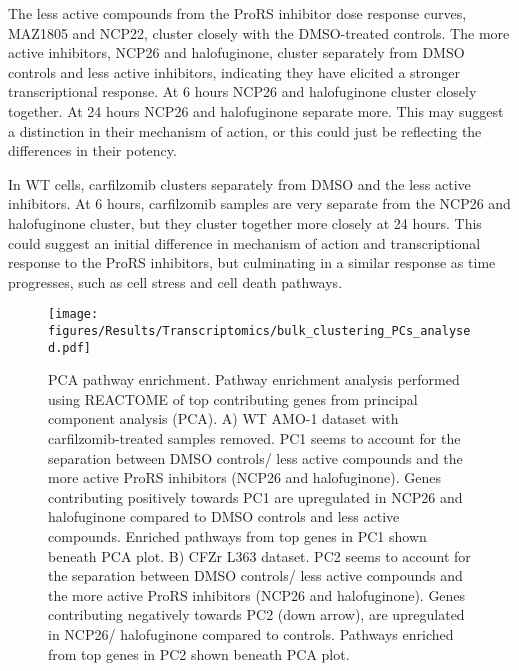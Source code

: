 The less active compounds from the ProRS inhibitor dose response curves, MAZ1805 and NCP22, cluster closely with the DMSO-treated controls.
The more active inhibitors, NCP26 and halofuginone, cluster separately from DMSO controls and less active inhibitors, indicating they have elicited a stronger transcriptional response.
At 6 hours NCP26 and halofuginone cluster closely together.
At 24 hours NCP26 and halofuginone separate more.
This may suggest a distinction in their mechanism of action, or this could just be reflecting the differences in their potency.

In WT cells, carfilzomib clusters separately from DMSO and the less active inhibitors.
At 6 hours, carfilzomib samples are very separate from the NCP26 and halofuginone cluster, but they cluster together more closely at 24 hours.
This could suggest an initial difference in mechanism of action and transcriptional response to the ProRS inhibitors, but culminating in a similar response as time progresses, such as cell stress and cell death pathways.

\begin{figure}[htb]
\centering
\texttt{[image: figures/Results/Transcriptomics/bulk\_clustering\_PCs\_analysed.pdf]}
\caption[PCA pathway enrichment]{PCA pathway enrichment.
Pathway enrichment analysis performed using REACTOME of top contributing genes from principal component analysis (PCA).
A) WT AMO-1 dataset with carfilzomib-treated samples removed.
PC1 seems to account for the separation between DMSO controls/ less active compounds and the more active ProRS inhibitors (NCP26 and halofuginone).
Genes contributing positively towards PC1 are upregulated in NCP26 and halofuginone compared to DMSO controls and less active compounds.
Enriched pathways from top genes in PC1 shown beneath PCA plot.
B) CFZr L363 dataset.
PC2 seems to account for the separation between DMSO controls/ less active compounds and the more active ProRS inhibitors (NCP26 and halofuginone).
Genes contributing negatively towards PC2 (down arrow), are upregulated in NCP26/ halofuginone compared to controls.
Pathways enriched from top genes in PC2 shown beneath PCA plot.}
\label{fig:pca_pathway}
\end{figure}


